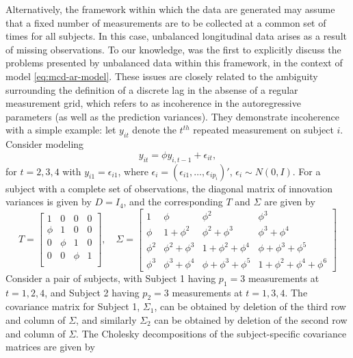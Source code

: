 Alternatively, the framework within which the data are generated may assume that a fixed number of measurements are to be collected at a common set of times for all subjects. In this case, unbalanced longitudinal data arises as a result of missing observations. To our knowledge, \cite{huang2012cautionary} was the first to explicitly discuss the problems presented by unbalanced data within this framework, in the context of model \eqref{eq:mcd-ar-model}. These issues are closely related to the ambiguity surrounding the definition of a discrete lag in the absense of a regular measurement grid, which \cite{huang2012cautionary} refers to as incoherence in the autoregressive parameters (as well as the prediction variances). They demonstrate incoherence with a simple example: let $y_{it}$ denote the $t^{th}$ repeated measurement on subject $i$. Consider modeling 
\begin{equation}
y_{it} = \phi y_{i,t-1} + \epsilon_{it},
\end{equation}
\noindent
for $t = 2,3,4$ with $y_{i1} = \epsilon_{i1}$, where $\epsilon_i = \left(\epsilon_{i1}, \dots, \epsilon_{ip_i} \right)'$, $\epsilon_i \sim N\left(0, I\right)$. For a subject with a complete set of observations, the diagonal matrix of innovation variances is given by $D = I_4$, and the corresponding $T$ and $\Sigma$ are given by 
\[
T = \begin{bmatrix}
1& 0 & 0 & 0  \\
\phi & 1& 0 & 0 \\
0 & \phi & 1& 0 \\
0 & 0 & \phi & 1\\
\end{bmatrix}, \quad
\Sigma = \begin{bmatrix} 
1 & \phi & \phi^2 & \phi^3 \\
\phi & 1 + \phi^2  & \phi^2 + \phi^3 &  \phi^3 + \phi^4 \\
\phi^2 & \phi^2 + \phi^3 & 1 + \phi^2 + \phi^4 & \phi + \phi^3 + \phi^5 \\
\phi^3 & \phi^3 + \phi^4 & \phi + \phi^3 + \phi^5 & 1 + \phi^2 + \phi^4 + \phi^6 
\end{bmatrix}
\]
Consider a pair of subjects, with Subject 1 having $p_1 = 3$ measurements at $t = 1, 2, 4$, and Subject 2 having $p_2 = 3$ measurements at $t = 1, 3, 4$. The covariance matrix for Subject 1, $\Sigma_1$, can be obtained by deletion of the third row and column of $\Sigma$, and similarly $\Sigma_2$ can be obtained by deletion of the second row and column of $\Sigma$. The Cholesky decompositions of the subject-specific covariance matrices are given by 
